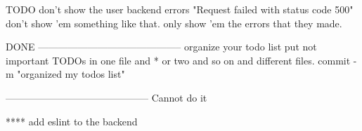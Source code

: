 TODO don't show the user backend errors "Request failed with 
    status code 500" don't show 'em something like that. only 
    show 'em the errors that they made.

DONE
--------------------------------------------
organize your todo list put not important TODOs in one file and * or two and so on and different files.
    commit -m "organized my todos list"



--------------------------------------------
Cannot do it

**** add eslint to the backend

